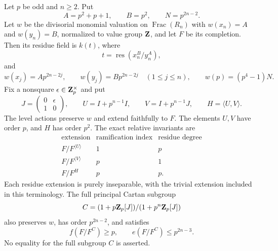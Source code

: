 \begin{proposition}\label{prop:divisorial-last-cartan}
Let $p$ be odd and $n\ge2$. Put
\[
 A=p^2+p+1,\qquad B=p^2,\qquad N=p^{2n-2}.
\]
Let $w$ be the divisorial monomial valuation on $\operatorname{Frac}(R_n)$ with $w(x_n)=A$ and $w(y_n)=B$, normalized to value group $\mathbf Z$, and let $F$ be its completion. Then its residue field is $k(t)$, where
\[
 t=\operatorname{res}(x_n^B/y_n^A),
\]
and
\begin{equation}\label{eq:divisorial-level-values}
 w(x_j)=A p^{2n-2j},\qquad w(y_j)=B p^{2n-2j}
 \quad(1\le j\le n),\qquad
 w(p)=(p^4-1)N.
\end{equation}
Fix a nonsquare $\epsilon\in\mathbf Z_p^\times$ and put
\[
 J=\begin{pmatrix}0&\epsilon\\1&0\end{pmatrix},\qquad
 U=I+p^{n-1}I,\qquad V=I+p^{n-1}J,\qquad H=\langle U,V\rangle .
\]
The level actions preserve $w$ and extend faithfully to $F$. The elements $U,V$ have order $p$, and $H$ has order $p^2$. The exact relative invariants are
\[
\begin{array}{c|cc}
 \text{extension}&\text{ramification index}&\text{residue degree}\\ \hline
 F/F^{\langle U\rangle}&1&p\\
 F/F^{\langle V\rangle}&p&1\\
 F/F^H&p&p .
\end{array}
\]
Each residue extension is purely inseparable, with the trivial extension included in this terminology. The full principal Cartan subgroup
\[
 C=(1+p\mathbf Z_p[J])/(1+p^n\mathbf Z_p[J])
\]
also preserves $w$, has order $p^{2n-2}$, and satisfies
\begin{equation}\label{eq:divisorial-full-cartan-bound}
 f(F/F^C)\ge p,\qquad e(F/F^C)\le p^{2n-3}.
\end{equation}
No equality for the full subgroup $C$ is asserted.
\end{proposition}

